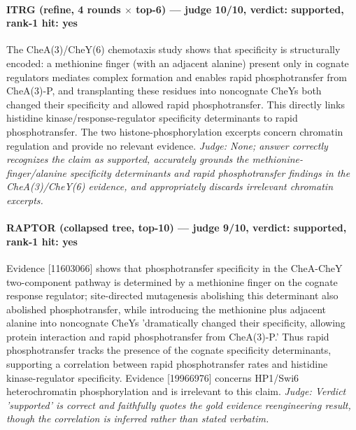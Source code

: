\documentclass[sigconf, review, anonymous]{acmart}
\begin{document}
\paragraph{ITRG (refine, 4 rounds $\times$ top-6) --- judge 10/10, verdict: supported, rank-1 hit: yes}
\noindent The CheA(3)/CheY(6) chemotaxis study shows that specificity is structurally encoded: a methionine finger (with an adjacent alanine) present only in cognate regulators mediates complex formation and enables rapid phosphotransfer from CheA(3)-P, and transplanting these residues into noncognate CheYs both changed their specificity and allowed rapid phosphotransfer. This directly links histidine kinase/response-regulator specificity determinants to rapid phosphotransfer. The two histone-phosphorylation excerpts concern chromatin regulation and provide no relevant evidence.
\noindent\small\textit{Judge: None; answer correctly recognizes the claim as supported, accurately grounds the methionine-finger/alanine specificity determinants and rapid phosphotransfer findings in the CheA(3)/CheY(6) evidence, and appropriately discards irrelevant chromatin excerpts.}
\paragraph{RAPTOR (collapsed tree, top-10) --- judge 9/10, verdict: supported, rank-1 hit: yes}
\noindent Evidence [11603066] shows that phosphotransfer specificity in the CheA-CheY two-component pathway is determined by a methionine finger on the cognate response regulator; site-directed mutagenesis abolishing this determinant also abolished phosphotransfer, while introducing the methionine plus adjacent alanine into noncognate CheYs 'dramatically changed their specificity, allowing protein interaction and rapid phosphotransfer from CheA(3)-P.' Thus rapid phosphotransfer tracks the presence of the cognate specificity determinants, supporting a correlation between rapid phosphotransfer rates and histidine kinase-regulator specificity. Evidence [19966976] concerns HP1/Swi6 heterochromatin phosphorylation and is irrelevant to this claim.
\noindent\small\textit{Judge: Verdict 'supported' is correct and faithfully quotes the gold evidence reengineering result, though the correlation is inferred rather than stated verbatim.}
\end{document}
